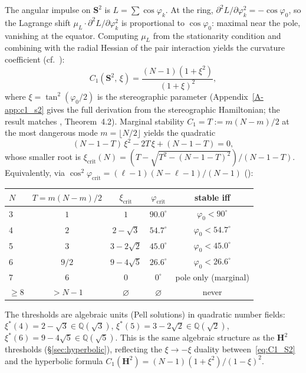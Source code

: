 The angular impulse on $\mathbf{S}^2$ is $L = \sum\cos\varphi_k$.
At the ring, $\partial^2 L/\partial\varphi_k^2 = -\cos\varphi_0$,
so the Lagrange shift
$\mu_L\cdot\partial^2 L/\partial\varphi_k^2$ is proportional to
$\cos\varphi_0$: maximal near the pole, vanishing at the equator.
Computing $\mu_L$ from the stationarity condition and combining with
the radial Hessian of the pair interaction yields the curvature
coefficient (cf.\ \citealt{BoattoCabral2003}):
\begin{equation}\label{eq:C1_S2}
  C_1(\mathbf{S}^2,\,\xi) = \frac{(N-1)(1+\xi^2)}{(1+\xi)^2},
\end{equation}
where $\xi = \tan^2(\varphi_0/2)$ is the stereographic parameter
(Appendix~\ref{A-app:c1_s2} gives the full derivation from the
stereographic Hamiltonian; the result matches
\citealt{LaurentPolzMontaldiRoberts2005}, Theorem~4.2).
Marginal stability $C_1 = T := m(N{-}m)/2$ at the most dangerous
mode $m = \lfloor N/2 \rfloor$ yields the quadratic
\begin{equation}\label{eq:xi_crit_S2}
  (N{-}1{-}T)\,\xi^2 - 2T\,\xi + (N{-}1{-}T) = 0,
\end{equation}
whose smaller root is
$\xi_{\mathrm{crit}}(N) = (T - \sqrt{T^2 - (N{-}1{-}T)^2})/(N{-}1{-}T)$.
Equivalently, via $\cos^2\!\varphi_{\mathrm{crit}} =
(\ell{-}1)(N{-}\ell{-}1)/(N{-}1)$
(\citealt{LaurentPolzMontaldiRoberts2005}):

\begin{center}
\begin{tabular}{lcccc}
\toprule
$N$ & $T = m(N{-}m)/2$ & $\xi_{\mathrm{crit}}$ &
  $\varphi_{\mathrm{crit}}$ & stable iff \\
\midrule
3 & $1$ & $1$ & $90.0^\circ$ & $\varphi_0 < 90^\circ$ \\
4 & $2$ & $2 - \sqrt{3}$ & $54.7^\circ$ & $\varphi_0 < 54.7^\circ$ \\
5 & $3$ & $3 - 2\sqrt{2}$ & $45.0^\circ$ & $\varphi_0 < 45.0^\circ$ \\
6 & $9/2$ & $9 - 4\sqrt{5}$ & $26.6^\circ$ & $\varphi_0 < 26.6^\circ$ \\
7 & $6$ & $0$ & $0^\circ$ & pole only (marginal) \\
$\ge 8$ & $> N{-}1$ & $\varnothing$ & $\varnothing$ & never \\
\bottomrule
\end{tabular}
\end{center}

\noindent
The thresholds are algebraic units (Pell solutions) in quadratic
number fields: $\xi^*(4) = 2 - \sqrt{3} \in \mathbb{Q}(\sqrt{3})$,
$\xi^*(5) = 3 - 2\sqrt{2} \in \mathbb{Q}(\sqrt{2})$,
$\xi^*(6) = 9 - 4\sqrt{5} \in \mathbb{Q}(\sqrt{5})$.
This is the same algebraic structure as the $\mathbf{H}^2$ thresholds
(\S\ref{sec:hyperbolic}), reflecting the $\xi \to -\xi$ duality
between~\eqref{eq:C1_S2} and the hyperbolic formula
$C_1(\mathbf{H}^2) = (N{-}1)(1+\xi^2)/(1-\xi)^2$.


